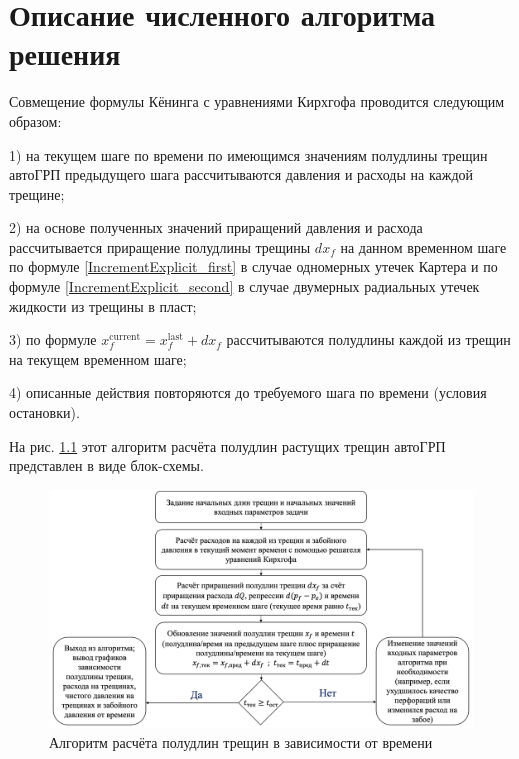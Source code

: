 \chapter{Описание численного алгоритма решения} \label{ch2}

Совмещение формулы Кёнинга с уравнениями Кирхгофа проводится следующим образом:

1) на текущем шаге по времени по имеющимся значениям полудлины трещин автоГРП предыдущего шага рассчитываются давления и расходы на каждой трещине;

2) на основе полученных значений приращений давления и расхода рассчитывается приращение полудлины трещины $dx_{\!f}$ на данном временном шаге по формуле \eqref{IncrementExplicit_first} в случае одномерных утечек Картера и по формуле \eqref{IncrementExplicit_second} в случае двумерных радиальных утечек жидкости из трещины в пласт;

3) по формуле $x_{\!f}^{\text{current}}=x_{\!f}^{\text{last}}+dx_{\!f}$ рассчитываются полудлины каждой из трещин на текущем временном шаге;

4) описанные действия повторяются до требуемого шага по времени (условия остановки).

На рис. \ref{fig:koning_scheme} этот алгоритм расчёта полудлин растущих трещин автоГРП представлен в виде блок-схемы.

\begin{figure}[H] 
\center
\includegraphics[width=\linewidth]{images/Koning_scheme.jpg}
\caption{Алгоритм расчёта полудлин трещин в зависимости от времени} 
\label{fig:koning_scheme}
\end{figure}




